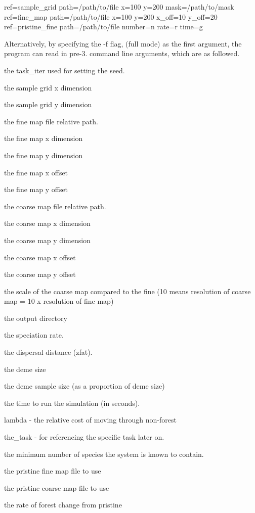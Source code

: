 ref=sample\+\_\+grid path=/path/to/file x=100 y=200 mask=/path/to/mask ref=fine\+\_\+map path=/path/to/file x=100 y=200 x\+\_\+off=10 y\+\_\+off=20 ref=pristine\+\_\+fine path=/path/to/file number=n rate=r time=g

Alternatively, by specifying the -\/f flag, (full mode) as the first argument, the program can read in pre-\/3. command line arguments, which are as followed.


\begin{DoxyEnumerate}
\item the task\+\_\+iter used for setting the seed.
\item the sample grid x dimension
\item the sample grid y dimension
\item the fine map file relative path.
\item the fine map x dimension
\item the fine map y dimension
\item the fine map x offset
\item the fine map y offset
\item the coarse map file relative path.
\item the coarse map x dimension
\item the coarse map y dimension
\item the coarse map x offset
\item the coarse map y offset
\item the scale of the coarse map compared to the fine (10 means resolution of coarse map = 10 x resolution of fine map)
\item the output directory
\item the speciation rate.
\item the dispersal distance (zfat).
\item the deme size
\item the deme sample size (as a proportion of deme size)
\item the time to run the simulation (in seconds).
\item lambda -\/ the relative cost of moving through non-\/forest
\item the\+\_\+task -\/ for referencing the specific task later on.
\item the minimum number of species the system is known to contain.
\item the pristine fine map file to use
\item the pristine coarse map file to use
\item the rate of forest change from pristine

\end{DoxyEnumerate}
